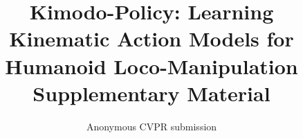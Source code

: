 \documentclass[10pt,twocolumn,letterpaper]{article}
\title{Kimodo-Policy: Learning Kinematic Action Models for\\Humanoid Loco-Manipulation\\Supplementary Material}
\author{Anonymous CVPR submission}
\begin{document}
\raggedbottom
\maketitle
\appendix

\FloatBarrier

{\small}
\end{document}
